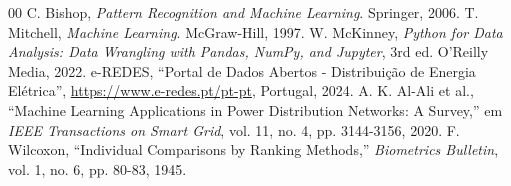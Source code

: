 \documentclass[conference]{IEEEtran}
\begin{document}
\begin{thebibliography}{00}
 C. Bishop, \textit{Pattern Recognition and Machine Learning}. Springer, 2006.
 T. Mitchell, \textit{Machine Learning}. McGraw-Hill, 1997.
 W. McKinney, \textit{Python for Data Analysis: Data Wrangling with Pandas, NumPy, and Jupyter}, 3rd ed. O'Reilly Media, 2022.
 e-REDES, ``Portal de Dados Abertos - Distribuição de Energia Elétrica'', \url{https://www.e-redes.pt/pt-pt}, Portugal, 2024.
 A. K. Al-Ali et al., ``Machine Learning Applications in Power Distribution Networks: A Survey,'' em \textit{IEEE Transactions on Smart Grid}, vol. 11, no. 4, pp. 3144-3156, 2020.
 F. Wilcoxon, ``Individual Comparisons by Ranking Methods,'' \textit{Biometrics Bulletin}, vol. 1, no. 6, pp. 80-83, 1945.
\end{thebibliography}
\end{document}
